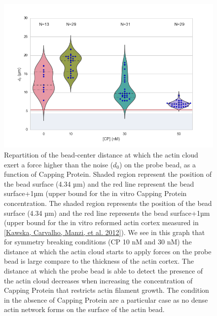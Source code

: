 \documentclass[A4paperpaper,11pt,english]{sphinxmanual}
\begin{document}
\begin{figure}[htbp]
\centering
\capstart

\includegraphics[width=0.650\linewidth]{d0_violin.png}
\caption{Repartition of the bead-center distance at which the actin cloud exert a
force higher than the noise (\(d_0\)) on the probe bead, as a function of
Capping Protein. Shaded region represent the position of the bead surface
(4.34 µm) and the red line represent the bead surface+1µm (upper bound for
the in vitro
Capping Protein concentration. The shaded region represents the position of
the bead surface (4.34 µm) and the red line represents the bead surface+1µm
(upper bound for the in vitro
reformed actin cortex measured in {\hyperref[index-latex:kawska2012]{{[}Kawska, Carvalho, Manzi,  et al.  2012{]}}}). We see in this graph that for symmetry breaking
conditions (CP 10 nM and 30 nM) the distance at which the actin cloud starts to apply
forces on the probe bead is large compare to the thickness of the actin
cortex. The distance at which the probe bead is able to detect the presence
of the actin cloud decreases when increasing the concentration of Capping
Protein that restricts  actin filament growth. The condition in the absence
of Capping Protein are a particular case as no dense actin network forms
on the surface of the actin bead.}\label{index-latex:d0-violin}\end{figure}
\end{document}
